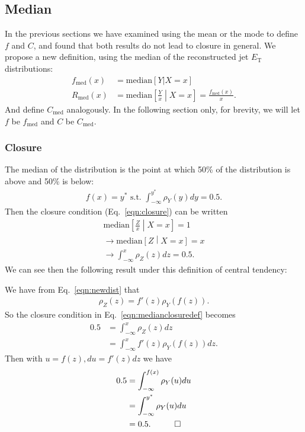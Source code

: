 \subsection{Median}
\label{sec:median}
In the previous sections we have examined using the mean or the mode to define $f$ and $C$, and found that both results do not lead to closure in general. We propose a new definition, using the median of the reconstructed jet $E_\text{T}$ distributions:
\begin{align}
f_\text{med}(x)&=\text{median}[Y|X=x]\\
R_\text{med}(x) &= \text{median}\left[\frac{Y}{x}\middle| X=x\right] = \frac{f_\text{med}(x)}{x}. 
\end{align}
And define $C_\text{med}$ analogously.  In the following section only, for brevity, we will let $f$ be $f_\text{med}$ and $C$ be $C_\text{med}$.
\subsubsection{Closure}
\label{sec:medianclosuresection}
The median of the distribution is the point at which 50\% of the distribution is above and 50\% is below:
\begin{align}
f(x) = y^* \text{ s.t. } \int_{-\infty}^{y^*} \rho_Y(y) dy = 0.5.
\end{align}
Then the closure condition (Eq.~\ref{eqn:closure}) can be written
\begin{align}
\text{median}\left[\frac{Z}{x}\middle| X=x\right] = 1\nonumber\\
\rightarrow \text{median}\left[Z\middle| X=x\right] = x\nonumber\\
\rightarrow \int_{-\infty}^{x} \rho_Z(z) dz = 0.5.
\label{eqn:medianclosuredef}
\end{align}
We can see then the following result under this definition of central tendency:

\vspace{5mm}


\vspace{5mm}

 We have from Eq.~\ref{eqn:newdist} that
\begin{align}
\rho_Z(z) = f'(z)\rho_Y(f(z)).
\end{align}
So the closure condition in Eq.~\ref{eqn:medianclosuredef} becomes
\begin{align}
0.5 &= \int_{-\infty}^{x} \rho_Z(z) dz\nonumber\\
&=\int_{-\infty}^{x} f'(z)\rho_Y(f(z)) dz.
\end{align}
Then with $u = f(z), du = f'(z) dz$ we have
\begin{align}
0.5 &= \int_{-\infty}^{f(x)} \rho_Y(u) du\nonumber\\
&=\int_{-\infty}^{y^*} \rho_Y(u) du\nonumber\\
&=0.5. \hspace{1 cm} \Box
\end{align}

